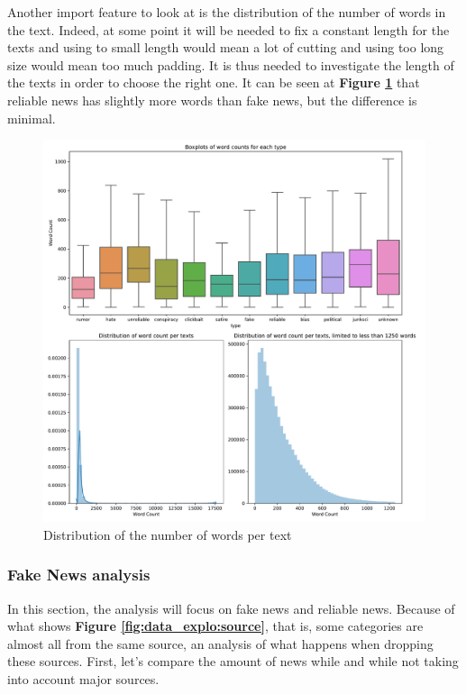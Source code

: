 Another import feature to look at is the distribution of the number of words in the text. Indeed, at some point it will be needed to fix a constant length for the texts and using to small length would mean a lot of cutting and using too long size would mean too much padding. It is thus needed to investigate the length of the texts in order to choose the right one. It can be seen at \textbf{Figure \ref{fig:data_explo:fake_corps_summary1}} that reliable news has slightly more words than fake news, but the difference is minimal. \\

\begin{figure}[!ht]
  \centering
  \includegraphics[width=\textwidth]{images/data_exploration/fake_corpus_summary1.pdf}
  \caption{Distribution of the number of words per text}
  \label{fig:data_explo:fake_corps_summary1}
\end{figure}

\subsubsection{Fake News analysis}
In this section, the analysis will focus on fake news and reliable news. Because of what shows \textbf{Figure \ref{fig:data_explo:source}}, that is, some categories are almost all from the same source, an analysis of what happens when dropping these sources. First, let’s compare the amount of news while and while not taking into account major sources. \\

